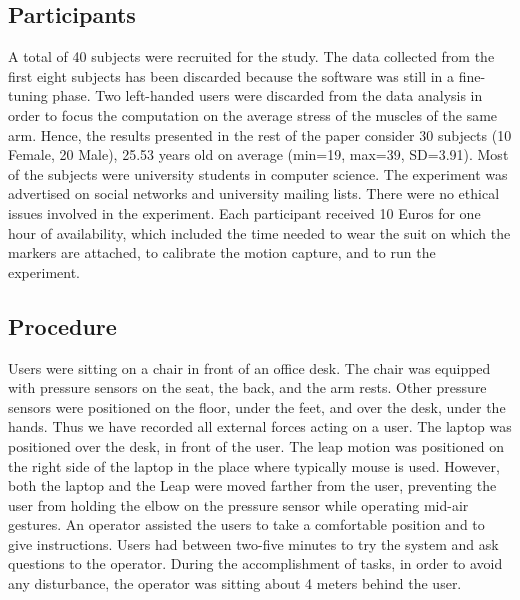 
\subsection{Participants}


A total of 40 subjects were recruited for the study. The data collected from the first eight subjects has been discarded because the software was still in a fine-tuning phase. Two left-handed users were discarded from the data analysis in order to focus the computation on the average stress of the muscles of the same arm. Hence, the results presented in the rest of the paper consider 30 subjects (10 Female, 20 Male), 25.53 years old on average (min=19, max=39, SD=3.91). Most of the subjects were university students in computer science.
The experiment was advertised on social networks and university mailing lists. There were no ethical issues involved in the experiment. Each participant received 10 Euros for one hour of availability, which included the time needed to wear the suit on which the markers are attached, to calibrate the motion capture, and to run the experiment.


\subsection{Procedure}

Users were sitting on a chair in front of an office desk. The chair was equipped with pressure sensors on the seat, the back, and the arm rests. Other pressure sensors were positioned on the floor, under the feet, and over the desk, under the hands. Thus we have recorded all external forces acting on a user. The laptop was positioned over the desk, in front of the user. The leap motion was positioned on the right side of the laptop in the place where typically mouse is used. However, both the laptop and the Leap were moved farther from the user, preventing the user from holding the elbow on the pressure sensor while operating mid-air gestures.
An operator assisted the users to take a comfortable position and to give instructions. Users had between two-five minutes to try the system and ask questions to the operator.
During the accomplishment of tasks, in order to avoid any disturbance, the operator was sitting about 4 meters behind the user.
